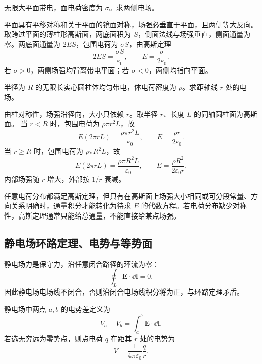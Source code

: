 \begin{example}[title={无限大均匀带电平面}]\label{eg:infinite-plane-gauss}
无限大平面带电，面电荷密度为 $\sigma$。求两侧电场。
\begin{solution}
平面具有平移对称和关于平面的镜面对称，场强必垂直于平面，且两侧等大反向。取跨过平面的薄柱形高斯面，两底面积为 $S$，侧面法线与场强垂直，侧面通量为零。两底面通量为 $2ES$，包围电荷为 $\sigma S$，由高斯定理
\[
  2ES=\frac{\sigma S}{\varepsilon_0},
  \qquad
  E=\frac{\sigma}{2\varepsilon_0}.
\]
若 $\sigma>0$，两侧场强均背离带电平面；若 $\sigma<0$，两侧均指向平面。
\end{solution}
\end{example}

\begin{example}[title={无限长均匀带电圆柱体}]\label{eg:charged-cylinder-gauss}
半径为 $R$ 的无限长实心圆柱体均匀带电，体电荷密度为 $\rho$。求距轴线 $r$ 处的电场。
\begin{solution}
由柱对称性，场强沿径向，大小只依赖 $r$。取半径 $r$、长度 $L$ 的同轴圆柱面为高斯面。
当 $r<R$ 时，包围电荷为 $\rho\pi r^2L$，故
\[
  E(2\pi rL)=\frac{\rho\pi r^2L}{\varepsilon_0},
  \qquad
  E=\frac{\rho r}{2\varepsilon_0}.
\]
当 $r\ge R$ 时，包围电荷为 $\rho\pi R^2L$，故
\[
  E(2\pi rL)=\frac{\rho\pi R^2L}{\varepsilon_0},
  \qquad
  E=\frac{\rho R^2}{2\varepsilon_0 r}.
\]
内部场强随 $r$ 增大，外部按 $1/r$ 衰减。
\end{solution}
\end{example}

\begin{pitfall}
任意电荷分布都满足高斯定理，但只有在高斯面上场强大小相同或可分段常量、方向关系明确时，通量积分才能转化为待求 $E$ 的代数方程。若电荷分布缺少对称性，高斯定理通常只能给总通量，不能直接给某点场强。
\end{pitfall}

\subsection{静电场环路定理、电势与等势面}

\begin{theorem}[静电场环路定理]\label{thm:electrostatic-circulation}
静电场力是保守力，沿任意闭合路径的环流为零：
\[
  \oint_L \bm E\cdot \dd\bm l=0.
\]
因此静电场电场线不闭合，否则沿闭合电场线积分将为正，与环路定理矛盾。
\end{theorem}

\begin{definition}[电势与电势差]\label{def:potential}
静电场中两点 $a,b$ 的电势差定义为
\[
  V_a-V_b=\int_a^b \bm E\cdot\dd\bm l.
\]
若选无穷远为零势点，则点电荷 $q$ 在距其 $r$ 处的电势为
\[
  V=\frac{1}{4\pi\varepsilon_0}\frac{q}{r}.
\]
\end{definition}

